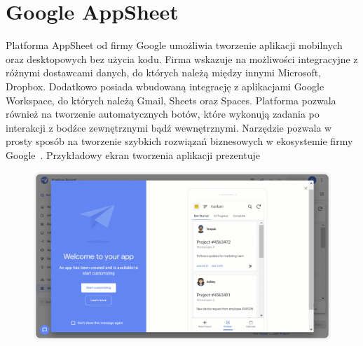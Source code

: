 \section{Google AppSheet}
Platforma AppSheet od firmy Google umożliwia tworzenie aplikacji mobilnych oraz desktopowych bez użycia kodu. Firma wskazuje na możliwości integracyjne z różnymi dostawcami danych, do których należą między innymi Microsoft, Dropbox. Dodatkowo posiada wbudowaną integrację z aplikacjami Google Workspace, do których należą Gmail, Sheets oraz Spaces. Platforma pozwala również na tworzenie automatycznych botów, które wykonują zadania po interakcji z bodźce zewnętrznymi bądź wewnętrznymi. Narzędzie pozwala w prosty sposób na tworzenie szybkich rozwiązań biznesowych w ekosystemie firmy Google~\cite{GoogleAppSheet}. Przykładowy ekran tworzenia aplikacji prezentuje 
\begin{figure}[H]
    \centering
    \includegraphics[width=\textwidth]{images/google_as}
    \label{fig:ga-as}
\end{figure}